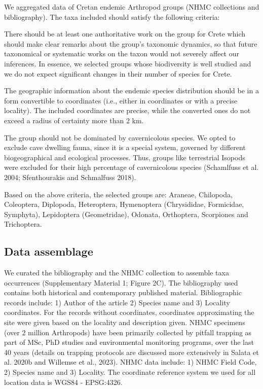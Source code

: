 We aggregated data of Cretan endemic Arthropod groups (NHMC collections and bibliography). The taxa included should satisfy the following criteria:

There should be at least one authoritative work on the group for Crete which
should make clear remarks about the group’s taxonomic dynamics, so that future
taxonomical or systematic works on the taxon would not severely affect our inferences.
In essence, we selected groups whose biodiversity is well studied and we do not
expect significant changes in their number of species for Crete. 

The geographic information about the endemic species distribution should be in
a form convertible to coordinates (i.e., either in coordinates or with a
precise locality). The included coordinates are precise, while the converted
ones do not exceed a radius of certainty more than 2 km.

The group should not be dominated by cavernicolous species. We opted to exclude
cave dwelling fauna, since it is a special system, governed by different
biogeographical and ecological processes. Thus, groups like terrestrial Isopods
were excluded for their high percentage of cavernicolous species (Schamlfuss et al. 2004; Sfenthourakis and Schmalfuss 2018).

Based on the above criteria, the selected groups are:
Araneae, Chilopoda, Coleoptera, Diplopoda, Heteroptera, Hymenoptera (Chrysididae, Formicidae, Symphyta), Lepidoptera (Geometridae), Odonata, Orthoptera, Scorpiones and Trichoptera.

    \subsection{Data assemblage}
    \label{subsec:arthropods-data-assemblage}

We curated the bibliography and the NHMC collection to assemble taxa
occurrences (Supplementary Material 1; Figure 2C). The bibliography used
contains both historical and contemporary published material. Bibliographic
records include: 1) Author of the article 2) Species name and 3) Locality coordinates.
For the records without coordinates, coordinates approximating the site were
given based on the locality and description given. NHMC specimens (over 2
million Arthropods) have been primarily collected by pitfall trapping as part
of MSc, PhD studies and environmental monitoring programs, over the last 40
years (details on trapping protocols are discussed more extensively in Salata et al. 2020b and Willemse et al., 2023).
NHMC data include: 1) NHMC Field Code, 2) Species name and 3) Locality.
The coordinate reference system we used for all location data is WGS84 - EPSG:4326.

